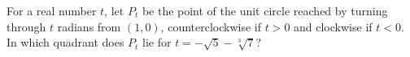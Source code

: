 For a real number $t$, let $P_t$ be the point of the unit circle reached by turning through $t$ radians from $(1,0)$, counterclockwise if $t>0$ and clockwise if $t<0$. In which quadrant does $P_t$ lie for $t=-\sqrt5-\sqrt[3]7$?
